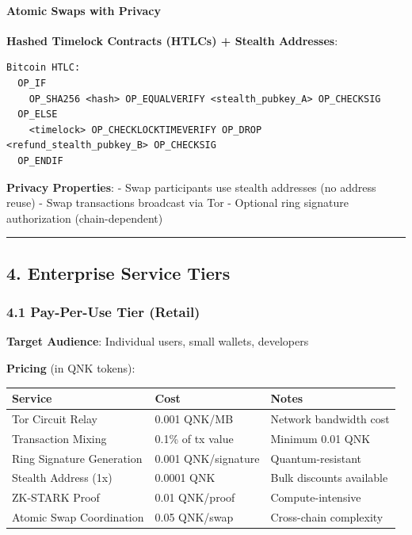 \documentclass[
  11pt,
]{article}
\begin{document}
\hypertarget{atomic-swaps-with-privacy}{%
\paragraph{Atomic Swaps with Privacy}\label{atomic-swaps-with-privacy}}

\textbf{Hashed Timelock Contracts (HTLCs) + Stealth Addresses}:

\begin{verbatim}
Bitcoin HTLC:
  OP_IF
    OP_SHA256 <hash> OP_EQUALVERIFY <stealth_pubkey_A> OP_CHECKSIG
  OP_ELSE
    <timelock> OP_CHECKLOCKTIMEVERIFY OP_DROP <refund_stealth_pubkey_B> OP_CHECKSIG
  OP_ENDIF
\end{verbatim}

\textbf{Privacy Properties}: - Swap participants use stealth addresses
(no address reuse) - Swap transactions broadcast via Tor - Optional ring
signature authorization (chain-dependent)

\begin{center}\rule{0.5\linewidth}{0.5pt}\end{center}

\hypertarget{enterprise-service-tiers}{%
\subsection{4. Enterprise Service
Tiers}\label{enterprise-service-tiers}}

\hypertarget{pay-per-use-tier-retail}{%
\subsubsection{4.1 Pay-Per-Use Tier
(Retail)}\label{pay-per-use-tier-retail}}

\textbf{Target Audience}: Individual users, small wallets, developers

\textbf{Pricing} (in QNK tokens):

\begin{longtable}[]{@{}lll@{}}
\toprule
Service & Cost & Notes \\
\midrule
\endhead
Tor Circuit Relay & 0.001 QNK/MB & Network bandwidth cost \\
Transaction Mixing & 0.1\% of tx value & Minimum 0.01 QNK \\
Ring Signature Generation & 0.001 QNK/signature & Quantum-resistant \\
Stealth Address (1x) & 0.0001 QNK & Bulk discounts available \\
ZK-STARK Proof & 0.01 QNK/proof & Compute-intensive \\
Atomic Swap Coordination & 0.05 QNK/swap & Cross-chain complexity \\
\bottomrule
\end{longtable}
\end{document}
